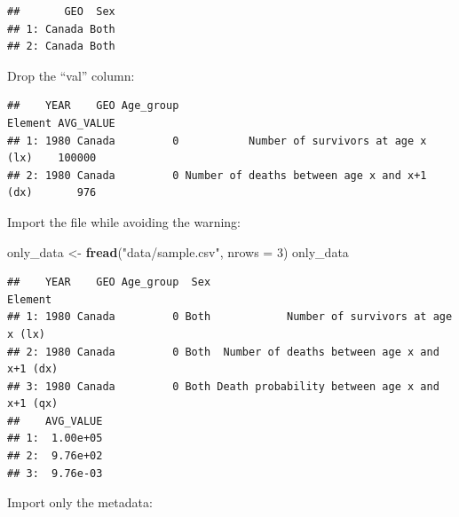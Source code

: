 \documentclass[]{book}
\newenvironment{Shaded}{\begin{snugshade}}{\end{snugshade}}
\newcommand{\DataTypeTok}[1]{\textcolor[rgb]{0.13,0.29,0.53}{#1}}
\newcommand{\DecValTok}[1]{\textcolor[rgb]{0.00,0.00,0.81}{#1}}
\newcommand{\KeywordTok}[1]{\textcolor[rgb]{0.13,0.29,0.53}{\textbf{#1}}}
\newcommand{\NormalTok}[1]{#1}
\newcommand{\OperatorTok}[1]{\textcolor[rgb]{0.81,0.36,0.00}{\textbf{#1}}}
\newcommand{\StringTok}[1]{\textcolor[rgb]{0.31,0.60,0.02}{#1}}
\begin{document}
\begin{verbatim}
##       GEO  Sex
## 1: Canada Both
## 2: Canada Both
\end{verbatim}

Drop the ``val'' column:

\begin{Shaded}
\end{Shaded}

\begin{verbatim}
##    YEAR    GEO Age_group                                     Element AVG_VALUE
## 1: 1980 Canada         0           Number of survivors at age x (lx)    100000
## 2: 1980 Canada         0 Number of deaths between age x and x+1 (dx)       976
\end{verbatim}

Import the file while avoiding the warning:

\begin{Shaded}
\begin{Highlighting}[]
\NormalTok{only_data <-}\StringTok{ }\KeywordTok{fread}\NormalTok{(}\StringTok{"data/sample.csv"}\NormalTok{, }\DataTypeTok{nrows =} \DecValTok{3}\NormalTok{)}
\NormalTok{only_data}
\end{Highlighting}
\end{Shaded}

\begin{verbatim}
##    YEAR    GEO Age_group  Sex                                      Element
## 1: 1980 Canada         0 Both            Number of survivors at age x (lx)
## 2: 1980 Canada         0 Both  Number of deaths between age x and x+1 (dx)
## 3: 1980 Canada         0 Both Death probability between age x and x+1 (qx)
##    AVG_VALUE
## 1:  1.00e+05
## 2:  9.76e+02
## 3:  9.76e-03
\end{verbatim}

Import only the metadata:

\begin{Shaded}
\end{Shaded}
\end{document}
